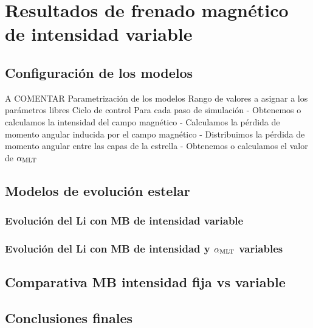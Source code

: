 \chapter{Resultados de frenado magnético de intensidad variable}\label{ch:septimo-capitulo}
\section{Configuración de los modelos} \label{marco_teorico}
A COMENTAR
Parametrización de los modelos
Rango de valores a asignar a los parámetros libres
Ciclo de control
Para cada paso de simulación
- Obtenemos o calculamos la intensidad del campo magnético
- Calculamos la pérdida de momento angular inducida por el campo magnético
- Distribuimos la pérdida de momento angular entre las capas de la estrella
- Obtenemos o calculamos el valor de $\alpha_{\mathrm{MLT}}$


\section{Modelos de evolución estelar}
\subsection{Evolución del Li con MB de intensidad variable}
\subsection{Evolución del Li con MB de intensidad y $\alpha_{\mathrm{MLT}}$ variables}
\section{Comparativa MB intensidad fija vs variable}
\section{Conclusiones finales}

\endinput

